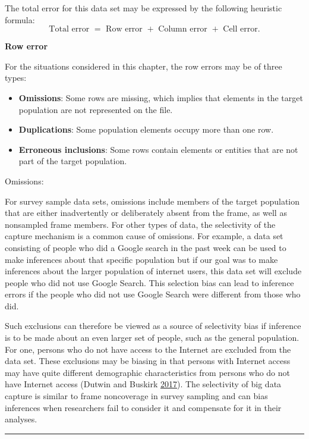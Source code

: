 \documentclass[]{krantz}
\begin{document}
The total error for this data set may be expressed by the following
heuristic formula:
\[\text{Total error } =\text{ Row error } + \text{ Column error }
+ \text{ Cell error}.\]

\textbf{Row error}

For the situations considered in this chapter, the row errors may be of
three types:

\begin{itemize}
\item
  \textbf{Omissions}: Some rows are missing, which implies that elements
  in the target population are not represented on the file.
\item
  \textbf{Duplications}: Some population elements occupy more than one
  row.
\item
  \textbf{Erroneous inclusions}: Some rows contain elements or entities
  that are not part of the target population.
\end{itemize}

Omissions:

For survey sample data sets, omissions include members of the target
population that are either inadvertently or deliberately absent from the
frame, as well as nonsampled frame members. For other types of data, the
selectivity of the capture mechanism is a common cause of omissions. For
example, a data set consisting of people who did a Google search in the
past week can be used to make inferences about that specific population
but if our goal was to make inferences about the larger population of
internet users, this data set will exclude people who did not use Google
Search. This selection bias can lead to inference errors if the people
who did not use Google Search were different from those who did.

Such exclusions can therefore be viewed as a source of selectivity bias
if inference is to be made about an even larger set of people, such as
the general population. For one, persons who do not have access to the
Internet are excluded from the data set. These exclusions may be biasing
in that persons with Internet access may have quite different
demographic characteristics from persons who do not have Internet access
(Dutwin and Buskirk \protect\hyperlink{ref-dutwinbuskirk2017}{2017}).
The selectivity of big data capture is similar to frame noncoverage in
survey sampling and can bias inferences when researchers fail to
consider it and compensate for it in their analyses.

\begin{center}\rule{0.5\linewidth}{\linethickness}\end{center}
\end{document}
